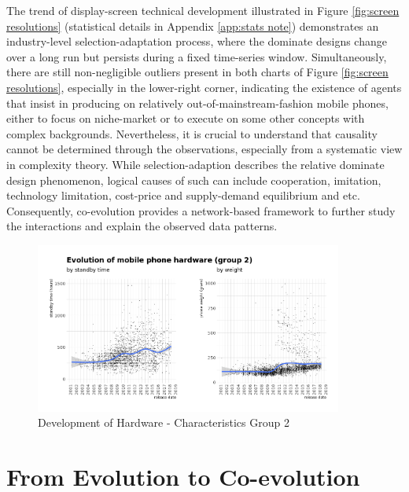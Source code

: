 \documentclass[utf8,english]{gradu3}
\begin{document}
The trend of display-screen technical development illustrated in Figure \ref{fig:screen resolutions} (statistical details in Appendix \ref{app:stats note}) demonstrates an industry-level selection-adaptation process, where the dominate designs change over a long run but persists during a fixed time-series window. Simultaneously, there are still non-negligible outliers present in both charts of Figure \ref{fig:screen resolutions}, especially in the lower-right corner, indicating the existence of agents that insist in producing on relatively out-of-mainstream-fashion mobile phones, either to focus on niche-market or to execute on some other concepts with complex backgrounds. Nevertheless, it is crucial to understand that causality cannot be determined through the observations, especially from a systematic view in complexity theory. While selection-adaption describes the relative dominate design phenomenon, logical causes of such can include cooperation, imitation, technology limitation, cost-price and supply-demand equilibrium and etc. Consequently, co-evolution provides a network-based framework to further study the interactions and explain the observed data patterns.

\begin{figure}[htb]
    \centering
    \includegraphics[width=0.90\textwidth]{evo2.png}
    \caption{Development of Hardware - Characteristics Group 2}
    \label{fig:standby}
\end{figure}

\section{From Evolution to Co-evolution}
\end{document}
